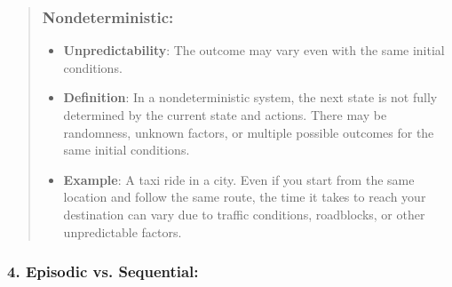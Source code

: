 \documentclass[
]{article}
\begin{document}
\begin{itemize}
\begin{itemize}
\begin{quote}
    \subsubsection{\texorpdfstring{\textbf{Nondeterministic}:}{Nondeterministic:}}\label{nondeterministic}

    \begin{itemize}
    \item
      \textbf{Unpredictability}: The outcome may vary even with the same
      initial conditions.
    \item
      \textbf{Definition}: In a nondeterministic system, the next state
      is not fully determined by the current state and actions. There
      may be randomness, unknown factors, or multiple possible outcomes
      for the same initial conditions.
    \item
      \textbf{Example}: A taxi ride in a city. Even if you start from
      the same location and follow the same route, the time it takes to
      reach your destination can vary due to traffic conditions,
      roadblocks, or other unpredictable factors.
    \end{itemize}
    \end{quote}
  \end{itemize}
\end{itemize}

\subsubsection{\texorpdfstring{\textbf{4. Episodic vs.
Sequential:}}{4. Episodic vs. Sequential:}}\label{4-episodic-vs-sequential}
\end{document}
